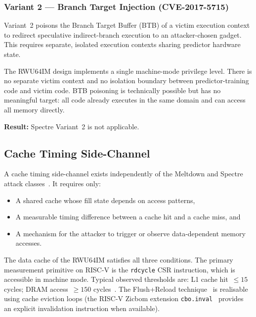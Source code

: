\subsubsection{Variant 2 — Branch Target Injection (CVE-2017-5715)}

Variant~2 poisons the Branch Target Buffer (BTB) of a victim execution context to
redirect speculative indirect-branch execution to an attacker-chosen gadget.  This
requires separate, isolated execution contexts sharing predictor hardware state.

The RWU64IM design implements a single machine-mode privilege level.  There is no
separate victim context and no isolation boundary between predictor-training code and
victim code.  BTB poisoning is technically possible but has no meaningful target: all
code already executes in the same domain and can access all memory directly.

\textbf{Result:} Spectre Variant~2 is not applicable.

\subsection{Cache Timing Side-Channel}

A cache timing side-channel exists independently of the Meltdown and Spectre attack
classes~\cite{gruss2016flushflush,arm2018cache}.  It requires only:
\begin{itemize}
  \item A shared cache whose fill state depends on access patterns,
  \item A measurable timing difference between a cache hit and a cache miss, and
  \item A mechanism for the attacker to trigger or observe data-dependent memory
        accesses.
\end{itemize}

The data cache of the RWU64IM satisfies all three conditions.  The primary
measurement primitive on RISC-V is the \texttt{rdcycle} CSR instruction, which is
accessible in machine mode.  Typical observed thresholds are: L1 cache hit~$\leq 15$
cycles; DRAM access~$\geq 150$ cycles~\cite{kocher2019spectre}.  The Flush+Reload
technique~\cite{lipp2018meltdown} is realisable using cache eviction loops (the
RISC-V Zicbom extension \texttt{cbo.inval}~\cite{riscv2022zicbom} provides an
explicit invalidation instruction when available).

